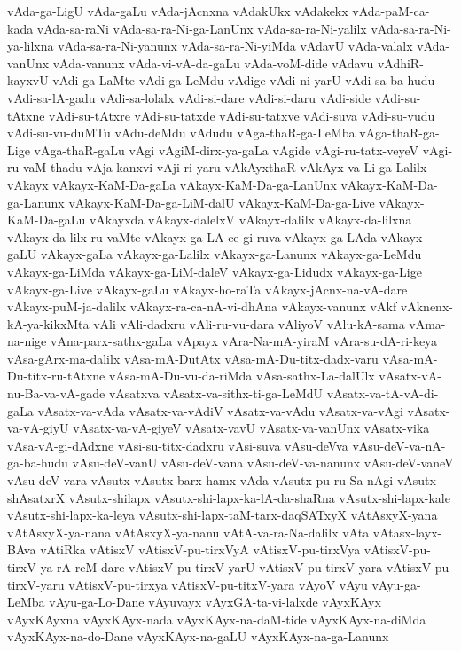 {vAda-ga-LigU
vAda-gaLu
vAda-jAcnxna
vAdakUkx
vAdakekx
vAda-paM-ca-kada
vAda-sa-raNi
vAda-sa-ra-Ni-ga-LanUnx
vAda-sa-ra-Ni-yalilx
vAda-sa-ra-Ni-ya-lilxna
vAda-sa-ra-Ni-yanunx
vAda-sa-ra-Ni-yiMda
vAdavU
vAda-valalx
vAda-vanUnx
vAda-vanunx
vAda-vi-vA-da-gaLu
vAda-voM-dide
vAdavu
vAdhiR-kayxvU
vAdi-ga-LaMte
vAdi-ga-LeMdu
vAdige
vAdi-ni-yarU
vAdi-sa-ba-hudu
vAdi-sa-lA-gadu
vAdi-sa-lolalx
vAdi-si-dare
vAdi-si-daru
vAdi-side
vAdi-su-tAtxne
vAdi-su-tAtxre
vAdi-su-tatxde
vAdi-su-tatxve
vAdi-suva
vAdi-su-vudu
vAdi-su-vu-duMTu
vAdu-deMdu
vAdudu
vAga-thaR-ga-LeMba
vAga-thaR-ga-Lige
vAga-thaR-gaLu
vAgi
vAgiM-dirx-ya-gaLa
vAgide
vAgi-ru-tatx-veyeV
vAgi-ru-vaM-thadu
vAja-kanxvi
vAji-ri-yaru
vAkAyxthaR
vAkAyx-va-Li-ga-Lalilx
vAkayx
vAkayx-KaM-Da-gaLa
vAkayx-KaM-Da-ga-LanUnx
vAkayx-KaM-Da-ga-Lanunx
vAkayx-KaM-Da-ga-LiM-dalU
vAkayx-KaM-Da-ga-Live
vAkayx-KaM-Da-gaLu
vAkayxda
vAkayx-dalelxV
vAkayx-dalilx
vAkayx-da-lilxna
vAkayx-da-lilx-ru-vaMte
vAkayx-ga-LA-ce-gi-ruva
vAkayx-ga-LAda
vAkayx-gaLU
vAkayx-gaLa
vAkayx-ga-Lalilx
vAkayx-ga-Lanunx
vAkayx-ga-LeMdu
vAkayx-ga-LiMda
vAkayx-ga-LiM-daleV
vAkayx-ga-Lidudx
vAkayx-ga-Lige
vAkayx-ga-Live
vAkayx-gaLu
vAkayx-ho-raTa
vAkayx-jAcnx-na-vA-dare
vAkayx-puM-ja-dalilx
vAkayx-ra-ca-nA-vi-dhAna
vAkayx-vanunx
vAkf
vAknenx-kA-ya-kikxMta
vAli
vAli-dadxru
vAli-ru-vu-dara
vAliyoV
vAlu-kA-sama
vAma-na-nige
vAna-parx-sathx-gaLa
vApayx
vAra-Na-mA-yiraM
vAra-su-dA-ri-keya
vAsa-gArx-ma-dalilx
vAsa-mA-DutAtx
vAsa-mA-Du-titx-dadx-varu
vAsa-mA-Du-titx-ru-tAtxne
vAsa-mA-Du-vu-da-riMda
vAsa-sathx-La-dalUlx
vAsatx-vA-nu-Ba-va-vA-gade
vAsatxva
vAsatx-va-sithx-ti-ga-LeMdU
vAsatx-va-tA-vA-di-gaLa
vAsatx-va-vAda
vAsatx-va-vAdiV
vAsatx-va-vAdu
vAsatx-va-vAgi
vAsatx-va-vA-giyU
vAsatx-va-vA-giyeV
vAsatx-vavU
vAsatx-va-vanUnx
vAsatx-vika
vAsa-vA-gi-dAdxne
vAsi-su-titx-dadxru
vAsi-suva
vAsu-deVva
vAsu-deV-va-nA-ga-ba-hudu
vAsu-deV-vanU
vAsu-deV-vana
vAsu-deV-va-nanunx
vAsu-deV-vaneV
vAsu-deV-vara
vAsutx
vAsutx-barx-hamx-vAda
vAsutx-pu-ru-Sa-nAgi
vAsutx-shAsatxrX
vAsutx-shilapx
vAsutx-shi-lapx-ka-lA-da-shaRna
vAsutx-shi-lapx-kale
vAsutx-shi-lapx-ka-leya
vAsutx-shi-lapx-taM-tarx-daqSATxyX
vAtAsxyX-yana
vAtAsxyX-ya-nana
vAtAsxyX-ya-nanu
vAtA-va-ra-Na-dalilx
vAta
vAtasx-layx-BAva
vAtiRka
vAtisxV
vAtisxV-pu-tirxVyA
vAtisxV-pu-tirxVya
vAtisxV-pu-tirxV-ya-rA-reM-dare
vAtisxV-pu-tirxV-yarU
vAtisxV-pu-tirxV-yara
vAtisxV-pu-tirxV-yaru
vAtisxV-pu-tirxya
vAtisxV-pu-titxV-yara
vAyoV
vAyu
vAyu-ga-LeMba
vAyu-ga-Lo-Dane
vAyuvayx
vAyxGA-ta-vi-lalxde
vAyxKAyx
vAyxKAyxna
vAyxKAyx-nada
vAyxKAyx-na-daM-tide
vAyxKAyx-na-diMda
vAyxKAyx-na-do-Dane
vAyxKAyx-na-gaLU
vAyxKAyx-na-ga-Lanunx
}
